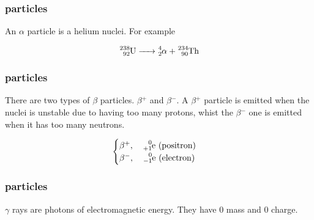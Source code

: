 \documentclass{article}
\begin{document}
\subsubsection{\alpha{} particles}

An \(\alpha\) particle is a helium nuclei. For example

\[
    \ce{^238_92U -> ^4_2\alpha{} + ^234_90Th}
\]

\subsubsection{\beta{} particles}

There are two types of \(\beta{}\) particles. \(\beta{}^+\) and \(\beta{}^-\).
A \(\beta{}^+\) particle is emitted when the nuclei is unstable due to
having too many protons, whist the \(\beta{}^-\) one is emitted when it has
too many neutrons.

\[
    \begin{cases}
        \beta{}^+,\quad \ce{^0_{+1}e} \text{ (positron)} \\
        \beta{}^-,\quad \ce{^0_{-1}e} \text{ (electron)}
    \end{cases}
\]

\subsubsection{\gamma{} particles}

\(\gamma\) rays are photons of electromagnetic energy. They have \(0\) mass and \(0\) charge.
\end{document}
